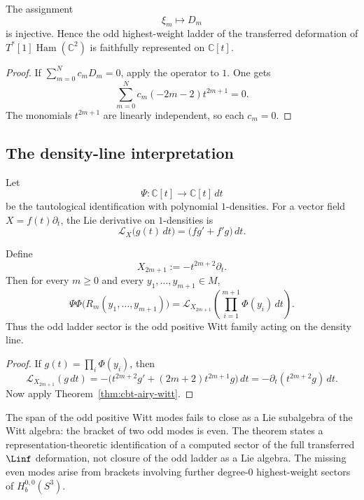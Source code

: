 \begin{corollary}[faithfulness]
\label{cor:cbt-faithfulness}
\ClaimStatusProvedHere
The assignment
\[
\xi_m\longmapsto D_m
\]
is injective. Hence the odd highest-weight ladder of the transferred deformation of $T^*[1]\operatorname{Ham}(\mathbb{C}^2)$ is faithfully represented on $\mathbb{C}[t]$.
\end{corollary}

\begin{proof}
If $\sum_{m=0}^N c_mD_m=0$, apply the operator to $1$. One gets
\[
\sum_{m=0}^N c_m(-2m-2)t^{2m+1}=0.
\]
The monomials $t^{2m+1}$ are linearly independent, so each $c_m=0$.
\end{proof}

\subsection{The density-line interpretation}
\label{sec:cbt-density-line}

Let
\[
\Psi:\mathbb{C}[t]\to \mathbb{C}[t]\,dt
\]
be the tautological identification with polynomial $1$-densities. For a vector field $X=f(t)\partial_t$, the Lie derivative on $1$-densities is
\[
\mathcal L_X\bigl(g(t)\,dt\bigr)
=
\bigl(fg'+f'g\bigr)\,dt.
\]

\begin{corollary}
\label{cor:cbt-witt-density}
\ClaimStatusProvedHere
Define
\[
X_{2m+1}:=-t^{2m+2}\partial_t.
\]
Then for every $m\ge0$ and every $y_1,\dots,y_{m+1}\in M$,
\[
\Psi\Phi\bigl(R_m(y_1,\dots,y_{m+1})\bigr)
=
\mathcal L_{X_{2m+1}}
\left(
\prod_{i=1}^{m+1}\Phi(y_i)\,dt
\right).
\]
Thus the odd ladder sector is the odd positive Witt family acting on the density line.
\end{corollary}

\begin{proof}
If $g(t)=\prod_i\Phi(y_i)$, then
\[
\mathcal L_{X_{2m+1}}(g\,dt)
=
-\bigl(t^{2m+2}g'+(2m+2)t^{2m+1}g\bigr)\,dt
=
-\partial_t(t^{2m+2}g)\,dt.
\]
Now apply Theorem~\ref{thm:cbt-airy-witt}.
\end{proof}

\begin{remark}
\label{rem:cbt-witt-caveat}
The span of the odd positive Witt modes fails to close as a Lie subalgebra of the Witt algebra: the bracket of two odd modes is even. The theorem states a representation-theoretic identification of a computed sector of the full transferred $\Linf$ deformation, not closure of the odd ladder as a Lie algebra. The missing even modes arise from brackets involving further degree-$0$ highest-weight sectors of $H_b^{0,0}(S^3)$.
\end{remark}

